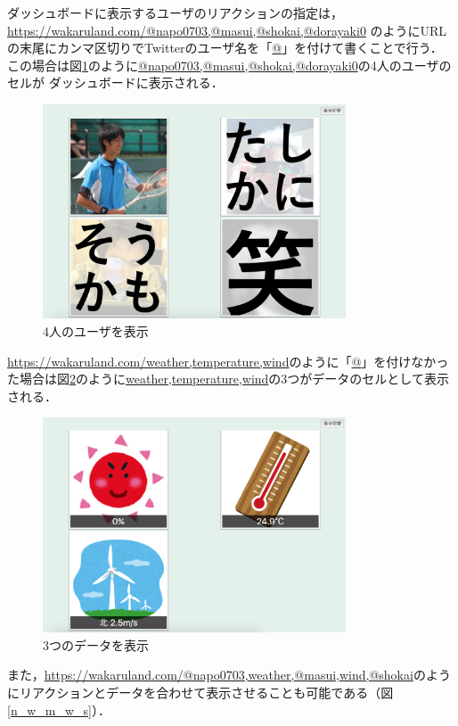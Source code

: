 ダッシュボードに表示するユーザのリアクションの指定は，
\url{https://wakaruland.com/@napo0703,@masui,@shokai,@dorayaki0}
のようにURLの末尾にカンマ区切りでTwitterのユーザ名を「\url{@}」を付けて書くことで行う．
この場合は図\ref{n_m_s_d}のように\url{@napo0703,@masui,@shokai,@dorayaki0}の4人のユーザのセルが
ダッシュボードに表示される．

\begin{figure}[H]
\centering
\includegraphics[width=9cm]{images/n_m_s_d.png}
\caption{4人のユーザを表示}
\label{n_m_s_d}
\end{figure}

\url{https://wakaruland.com/weather,temperature,wind}のように「\url{@}」を付けなかった場合は図\ref{w_t_w}のように\url{weather,temperature,wind}の3つがデータのセルとして表示される．

\begin{figure}[H]
\centering
\includegraphics[width=9cm]{images/w_t_w.png}
\caption{3つのデータを表示}
\label{w_t_w}
\end{figure}

また，\url{https://wakaruland.com/@napo0703,weather,@masui,wind,@shokai}のようにリアクションとデータを合わせて表示させることも可能である（図\ref{n_w_m_w_s}）．

